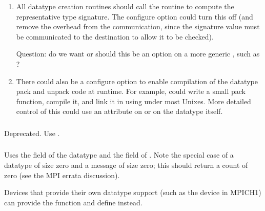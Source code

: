\documentclass{article}
\begin{document}
\begin{enumerate}
\item All datatype creation routines should call the routine
     to compute the representative type
    signature. The configure option
     could turn this off (and remove
the overhead from the communication, since the signature value must be
communicated to the destination to allow it to be checked).

    Question: do we want  or should
    this be an option on a more generic ,
    such as ?

\item There could also be a configure option to enable compilation of
the datatype pack and unpack code at runtime.  For example,
 could write a small pack function, compile it,
and link it in using  under most Unixes. More detailed
control of this could use an attribute on  or on
the datatype itself.

\end{enumerate}

\subsubsection{}
Deprecated.  Use .

\subsubsection{}
Uses the  field of the datatype 
and the
 field of .  
Note the
special case of a 
datatype of size zero and a message of size zero; this should return a count
of zero (see the MPI errata discussion). 

Devices that provide their own datatype support (such as the
 device in MPICH1) can provide the function
 and define 
instead.
\end{document}
